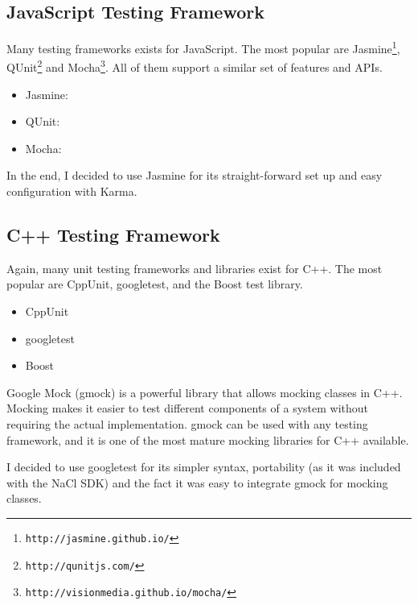 
\subsection{JavaScript Testing Framework} %
\label{sub:js_test_framework}
Many testing frameworks exists for JavaScript. The most popular are Jasmine\footnote{\lstinline+http://jasmine.github.io/+}, QUnit\footnote{\lstinline+http://qunitjs.com/+} and Mocha\footnote{\lstinline+http://visionmedia.github.io/mocha/+}. All of them support a similar set of features and APIs. 

\begin{itemize}
	\item Jasmine: %
	\item QUnit:  %
	\item Mocha: %
\end{itemize}

In the end, I decided to use Jasmine for its straight-forward set up and easy configuration with Karma.


\subsection{C++ Testing Framework} %
\label{sub:cpp_testing}
Again, many unit testing frameworks and libraries exist for C++. The most popular are CppUnit, googletest, and the Boost test library.

\begin{itemize}
	\item CppUnit
	\item googletest
	\item Boost
\end{itemize}

Google Mock (gmock) is a powerful library that allows mocking classes in C++. Mocking makes it easier to test different components of a system without requiring the actual implementation. gmock can be used with any testing framework, and it is one of the most mature mocking libraries for C++ available.

I decided to use googletest for its simpler syntax, portability (as it was included with the NaCl SDK) and the fact it was easy to integrate gmock for mocking classes.


